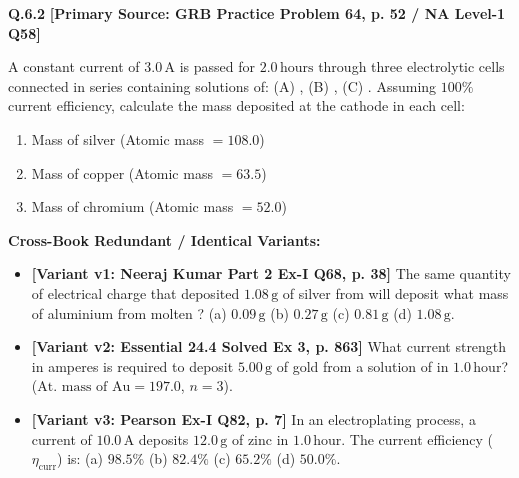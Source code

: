 \begin{problembox}
\textbf{Q.6.2} \hfill \textbf{[Primary Source: GRB Practice Problem 64, p. 52 / NA Level-1 Q58]}
\label{q:qb-c6-02}

A constant current of $3.0\,\text{A}$ is passed for $2.0\,\text{hours}$ through three electrolytic cells connected in series containing solutions of:
(A) , (B) , (C) .
Assuming $100\%$ current efficiency, calculate the mass deposited at the cathode in each cell:
\begin{enumerate}[label=(\alph*)]
    \item Mass of silver (Atomic mass $= 108.0$)
    \item Mass of copper (Atomic mass $= 63.5$)
    \item Mass of chromium (Atomic mass $= 52.0$)
\end{enumerate}

\tcbline
\textbf{\color{accentamber}Cross-Book Redundant / Identical Variants:}
\begin{itemize}[leftmargin=*,itemsep=2pt]
    \item \textbf{[Variant v1: Neeraj Kumar Part 2 Ex-I Q68, p. 38]} The same quantity of electrical charge that deposited $1.08\,\text{g}$ of silver from  will deposit what mass of aluminium from molten ? (a) $0.09\,\text{g}$ (b) $0.27\,\text{g}$ (c) $0.81\,\text{g}$ (d) $1.08\,\text{g}$.
    \item \textbf{[Variant v2: Essential  24.4 Solved Ex 3, p. 863]} What current strength in amperes is required to deposit $5.00\,\text{g}$ of gold from a solution of  in $1.0\,\text{hour}$? ($\text{At. mass of Au} = 197.0$, $n = 3$).
    \item \textbf{[Variant v3: Pearson Ex-I Q82, p. 7]} In an electroplating process, a current of $10.0\,\text{A}$ deposits $12.0\,\text{g}$ of zinc in $1.0\,\text{hour}$. The current efficiency ($\eta_{\text{curr}}$) is: (a) $98.5\%$ (b) $82.4\%$ (c) $65.2\%$ (d) $50.0\%$.
\end{itemize}
\end{problembox}

